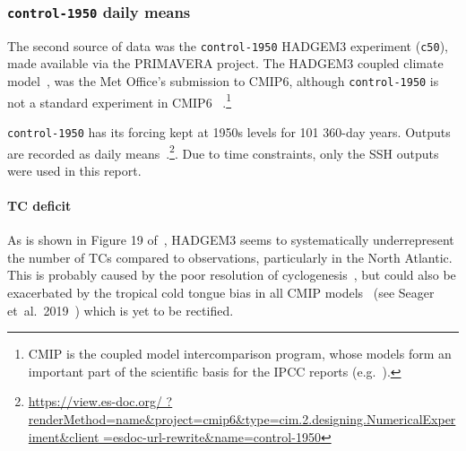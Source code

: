 \subsubsection{\texttt{control-1950} daily means}

\label{sec:control-1950-intro}

The second source of data was the \texttt{control-1950} HADGEM3 experiment (\texttt{c50}),
made available via the PRIMAVERA project.
The HADGEM3 coupled climate model~\cite{williams2018met, FurtherInfo},
 was the Met Office's submission to CMIP6,
although \texttt{control-1950} is not a standard experiment in CMIP6~\cite{eyring2016overview}
.\footnote{CMIP is the coupled model intercomparison program,
whose models form an important part of the scientific basis for the IPCC
reports (e.g.~\cite{SROCC}).}

\texttt{control-1950} has its forcing kept at
1950s levels for 101 360-day years. Outputs are recorded as daily
means~\cite{williams2018met, FurtherInfo}.\footnote{\url{https://view.es-doc.org/
        ?renderMethod=name&project=cmip6&type=cim.2.designing.NumericalExperiment&client
        =esdoc-url-rewrite&name=control-1950}}.
Due to time constraints, only the SSH outputs were used in this report.

\paragraph{TC deficit} As is shown in Figure 19 of~\cite{williams2018met},
 HADGEM3 seems to systematically underrepresent
 the number of TCs compared to observations,
 particularly in the North Atlantic.
 This is probably caused by the poor resolution
 of cyclogenesis~\cite{tomassini2017interaction},
 but could also be exacerbated by the tropical
 cold tongue bias in all CMIP models~\cite{camargo2013global} (see Seager et~al.~2019~\cite{seager2019strengthening})
 which is yet to be rectified.

